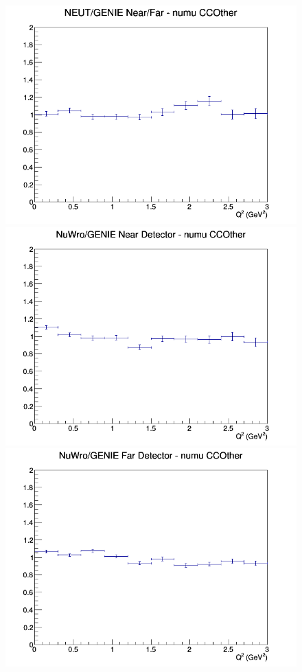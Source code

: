 \documentclass[12pt]{article}
\begin{document}
\begin{figure}[h]
\endminipage
{}
\includegraphics[width=\linewidth]{eff_Q2/FGT/ratios/CCOther_NEUT_GENIE_numu_NF_Q2.png}
\endminipage
\newline
{}
\includegraphics[width=\linewidth]{eff_Q2/FGT/ratios/CCOther_NuWro_GENIE_numu_near_Q2.png}
\endminipage
{}
\includegraphics[width=\linewidth]{eff_Q2/FGT/ratios/CCOther_NuWro_GENIE_numu_far_Q2.png}

\end{figure}
\end{document}
